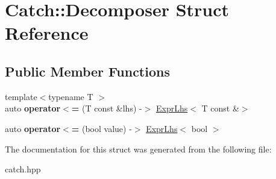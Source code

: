 \hypertarget{structCatch_1_1Decomposer}{}\section{Catch\+:\+:Decomposer Struct Reference}
\label{structCatch_1_1Decomposer}
\subsection*{Public Member Functions}
\begin{DoxyCompactItemize}
\item 
\mbox{\label{structCatch_1_1Decomposer_a20b5b8c0e2ff0328a019ae1a8deca03a}} 
{\footnotesize template$<$typename T $>$ }\\auto {\bfseries operator$<$=} (T const \&lhs) -\/$>$ \hyperlink{classCatch_1_1ExprLhs}{Expr\+Lhs}$<$ T const \&$>$
\item 
\mbox{\label{structCatch_1_1Decomposer_aac129b94903ae1339d5709049d83613b}} 
auto {\bfseries operator$<$=} (bool value) -\/$>$ \hyperlink{classCatch_1_1ExprLhs}{Expr\+Lhs}$<$ bool $>$
\end{DoxyCompactItemize}


The documentation for this struct was generated from the following file\+:\begin{DoxyCompactItemize}
\item 
catch.\+hpp\end{DoxyCompactItemize}
